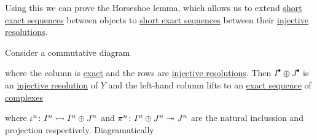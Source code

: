 \documentclass[../../main]{subfiles}
\begin{document}
Using this we can prove the Horseshoe lemma, which allows us to extend \hyperref[def:exact-sequence]{short exact sequences} between objects to \hyperref[def:exact-sequence]{short exact sequences} between their \hyperref[def:resolution]{injective resolutions}.
\begin{theorem}\label{thm:horseshoe}
  Consider a commutative diagram
  \begin{center}
  \end{center}
  where the column is \hyperref[def:exact-sequence]{exact} and the rows are \hyperref[def:resolution]{injective resolutions}.
  Then \(I^{\bullet} \oplus J^{\bullet}\) is an \hyperref[def:resolution]{injective resolution} of \(Y\) and the left-hand column lifts to an \hyperref[def:exact-sequence]{exact sequence} of \hyperref[def:complex]{complexes}
  \begin{center}
  \end{center}
  where \(\iota^{n}\colon I^{n} \rightarrowtail I^{n} \oplus J^{n}\) and \(\pi^{n}\colon I^{n} \oplus J^{n} \twoheadrightarrow J^{n}\) are the natural inclussion and projection respectively.
  Diagramatically
  \begin{center}
  \end{center}
\end{theorem}
\end{document}
